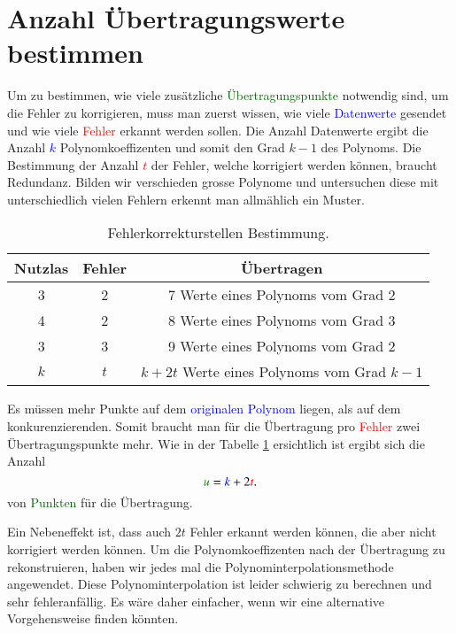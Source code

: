 \section{Anzahl Übertragungswerte bestimmen
\label{reedsolomon:section:Fehlerkorrekturstellen}}
Um zu bestimmen, wie viele zusätzliche \textcolor{darkgreen}{Übertragungspunkte} notwendig sind, um die Fehler zu korrigieren,
    muss man zuerst wissen, wie viele \textcolor{blue}{Datenwerte} gesendet und wie viele \textcolor{red}{Fehler} erkannt werden sollen. 
Die Anzahl Datenwerte ergibt die Anzahl
\textcolor{blue}{$k$}
Polynomkoeffizenten
und somit den Grad $k-1$ des Polynoms.
Die Bestimmung der Anzahl \textcolor{red}{$t$} der Fehler, welche korrigiert werden können, braucht Redundanz.
Bilden wir verschieden grosse Polynome und untersuchen diese mit unterschiedlich vielen Fehlern erkennt man allmählich ein Muster.

\begin{table}%
    \centering
    \begin{tabular}{ c c | c} 
        \hline
        Nutzlas & Fehler & Übertragen \\
        \hline 
        3 & 2 & 7 Werte eines Polynoms vom Grad 2 \\ 
        4 & 2 & 8 Werte eines Polynoms vom Grad 3 \\
        3 & 3 & 9 Werte eines Polynoms vom Grad 2 \\ 
        \hline
        $k$ & $t$ & $k+2t$ Werte eines Polynoms vom Grad $k-1$ \\ 
        \hline
    \end{tabular}
    \caption{ Fehlerkorrekturstellen Bestimmung.}
    \label{tab:fehlerkorrekturstellen}
\end{table}
\par 
Es müssen mehr Punkte auf dem \textcolor{blue}{originalen Polynom} liegen, als auf dem konkurenzierenden.
Somit braucht man für die Übertragung pro \textcolor{red}{Fehler} zwei Übertragungspunkte mehr.
Wie in der Tabelle \ref{tab:fehlerkorrekturstellen} ersichtlich ist ergibt sich die
Anzahl
\begin{equation}
    \textcolor{darkgreen}{u}=
    \textcolor{blue}{k}+2\textcolor{red}{t}.
    \label{reedsolomon:equation2}
\end{equation}
von \textcolor{darkgreen}{Punkten} für die Übertragung.

Ein Nebeneffekt ist, dass auch $2t$ Fehler erkannt werden können, die aber nicht korrigiert werden können.
Um die Polynomkoeffizenten nach der Übertragung zu rekonstruieren, haben wir jedes mal die Polynominterpolationsmethode angewendet.
Diese Polynominterpolation ist leider schwierig zu berechnen und sehr fehleranfällig.
Es wäre daher einfacher, wenn wir eine alternative Vorgehensweise finden könnten. 



